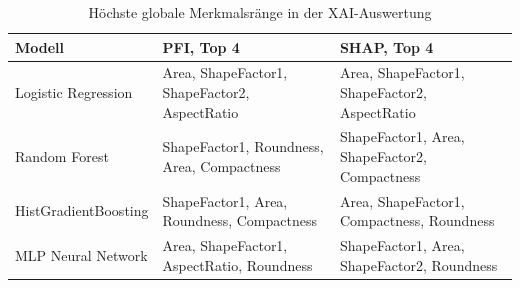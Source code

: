 \begin{table}
\caption{Höchste globale Merkmalsränge in der XAI-Auswertung}
\label{tab:xai_modellvergleich}
\begin{tabular}{lll}
\toprule
Modell & PFI, Top 4 & SHAP, Top 4 \\
\midrule
Logistic Regression & Area, ShapeFactor1, ShapeFactor2, AspectRatio & Area, ShapeFactor1, ShapeFactor2, AspectRatio \\
Random Forest & ShapeFactor1, Roundness, Area, Compactness & ShapeFactor1, Area, ShapeFactor2, Compactness \\
HistGradientBoosting & ShapeFactor1, Area, Roundness, Compactness & Area, ShapeFactor1, Compactness, Roundness \\
MLP Neural Network & Area, ShapeFactor1, AspectRatio, Roundness & ShapeFactor1, Area, ShapeFactor2, Roundness \\
\bottomrule
\end{tabular}
\end{table}
